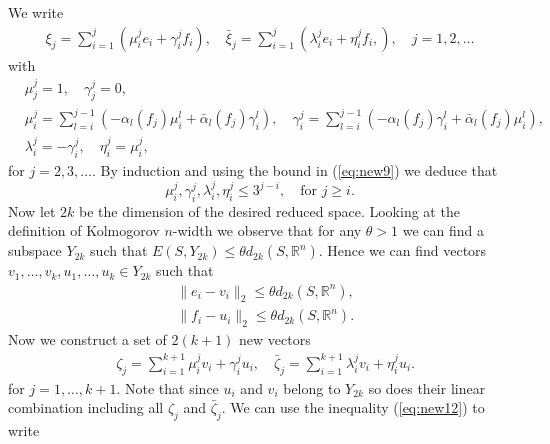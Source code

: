 We write
\begin{equation} \label{eq:new10}
\begin{aligned}
	\xi_j = \sum_{i=1}^j \left( \mu_i^j e_i + \gamma_i^j f_i \right), \quad \bar{\xi}_j = \sum_{i=1}^j \left( \lambda_i^j e_i + \eta_i^j f_i,  \right), \quad j=1,2,\dots
\end{aligned}
\end{equation}
with
\begin{equation} \label{eq:new11}
\begin{aligned}
	&\mu^j_j = 1, \quad \gamma^j_j = 0, \\
	&\mu_i^j = \sum_{l=i}^{j-1}\left( - \alpha_l(f_j) \mu_i^l  + \bar{\alpha}_l(f_j) \gamma_i^l \right), \quad\gamma_i^j = \sum_{l=i}^{j-1}\left( - \alpha_l(f_j) \gamma_i^l  + \bar{\alpha}_l(f_j) \mu_i^l \right), \\
	&\lambda^j_i = - \gamma ^j_i, \quad \eta^j_i = \mu^j_i,
\end{aligned}
\end{equation}
for $j=2,3,\dots$. By induction and using the bound in (\ref{eq:new9}) we deduce that
\begin{equation} \label{eq:new12}
	\mu^j_i,\gamma^j_i,\lambda^j_i,\eta^j_i \leq 3^{j-i}, \quad \text{for } j\geq i.
\end{equation}
Now let $2k$ be the dimension of the desired reduced space. Looking at the definition of Kolmogorov $n$-width we observe that for any $\theta > 1$ we can find a subspace $Y_{2k}$ such that $E(S,Y_{2k}) \leq \theta d_{2k}(S,\mathbb R^n)$. Hence we can find vectors $v_1,\dots,v_k,u_1,\dots,u_k\in Y_{2k}$ such that
\begin{equation} \label{eq:new13}
\begin{aligned}
	& \|e_i - v_i\|_2 \leq \theta d_{2k}(S,\mathbb R^n), \\
	& \|f_i - u_i\|_2 \leq \theta d_{2k}(S,\mathbb R^n).
\end{aligned}
\end{equation}
Now we construct a set of $2(k+1)$ new vectors
\begin{equation} \label{eq:new14}
\begin{aligned}
	& \zeta_j = \sum_{i=1}^{k+1} \mu_i^j v_i + \gamma^j_i u_i,\quad \bar{\zeta}_j = \sum_{i=1}^{k+1} \lambda_i^j v_i + \eta^j_i u_i.
\end{aligned}
\end{equation}
for $j = 1,\dots,k+1$. Note that since $u_i$ and $v_i$ belong to $Y_{2k}$ so does their linear combination including all $\zeta_j$ and $\bar{\zeta}_j$. We can use the inequality (\ref{eq:new12}) to write
